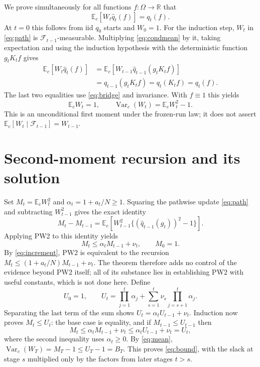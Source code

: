 \documentclass[11pt]{article}
\newcommand{\Ec}{\mathbb E_c}
\newcommand{\Vc}{\operatorname{Var}_c}
\newcommand{\qh}{\widehat q}
\begin{document}
We prove simultaneously for all functions $f:\Omega\to\mathbb R$ that
\begin{equation}\label{eq:weighted}
 \Ec[W_t\qh_t(f)]=q_t(f).
\end{equation}
At $t=0$ this follows from iid $q_0$ starts and $W_0=1$. For the
induction step, $W_t$ in \eqref{eq:path} is
$\mathcal F_{t-1}$-measurable. Multiplying \eqref{eq:condmean} by it,
taking expectation and using the induction hypothesis with the
deterministic function $g_tK_tf$ gives
\begin{align*}
 \Ec[W_t\qh_t(f)]
 &=\Ec[W_{t-1}\qh_{t-1}(g_tK_tf)]\\
 &=q_{t-1}(g_tK_tf)=q_t(K_tf)=q_t(f).
\end{align*}
The last two equalities use \eqref{eq:bridge} and invariance. With
$f\equiv1$ this yields
\begin{equation}\label{eq:mean}
 \Ec W_t=1,\qquad \Vc(W_t)=\Ec W_t^2-1.
\end{equation}
This is an unconditional first moment under the frozen-run law; it does
not assert $\mathbb E_c[W_t\mid\mathcal F_{t-1}]=W_{t-1}$.

\section{Second-moment recursion and its solution}
Set $M_t=\Ec W_t^2$ and $\alpha_t=1+a_t/N\ge1$.
Squaring the pathwise update \eqref{eq:path} and subtracting
$W_{t-1}^2$ gives the exact identity
\begin{equation}\label{eq:increment}
 M_t-M_{t-1}
 =\Ec\!\left[W_{t-1}^2
       \{(\qh_{t-1}(g_t))^2-1\}\right].
\end{equation}
Applying PW2 to this identity yields
\begin{equation}\label{eq:rec}
 M_t\le\alpha_t M_{t-1}+\nu_t,\qquad M_0=1.
\end{equation}
By \eqref{eq:increment}, PW2 is equivalent to the recursion
$M_t\le(1+a_t/N)M_{t-1}+\nu_t$. The theorem therefore adds no control of
the evidence beyond PW2 itself; all of its substance lies in establishing
PW2 with useful constants, which is not done here.
Define
\[
 U_0=1,\qquad
 U_t=\prod_{j=1}^t\alpha_j
       +\sum_{s=1}^t\nu_s\prod_{j=s+1}^t\alpha_j.
\]
Separating the last term of the sum shows
$U_t=\alpha_t U_{t-1}+\nu_t$. Induction now proves $M_t\le U_t$:
the base case is equality, and if $M_{t-1}\le U_{t-1}$ then
\[
 M_t\le\alpha_tM_{t-1}+\nu_t
       \le\alpha_tU_{t-1}+\nu_t=U_t,
\]
where the second inequality uses $\alpha_t\ge0$.
By \eqref{eq:mean}, $\Vc(W_T)=M_T-1\le U_T-1=B_T$.
This proves \eqref{eq:bound}, with the slack at stage $s$ multiplied
only by the factors from later stages $t>s$.
\end{document}
